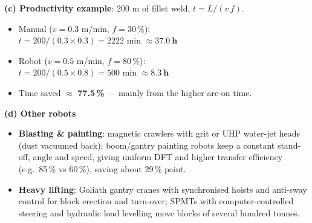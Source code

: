 \documentclass[11pt,a4paper]{article}
\begin{document}
\begin{enumerate}
\begin{answer}
\begin{minipage}[t]{0.57\linewidth}
				\medskip
				\textbf{(c) Productivity example}: 200 m of fillet weld, $t = L/(v\,f)$.
				\begin{itemize}[itemsep=1pt]
					\item Manual ($v = 0.3$ m/min, $f = 30\,\%$):\\
					$t = 200/(0.3\times0.3) = 2222$ min $\approx \mathbf{37.0\ h}$
					\item Robot ($v = 0.5$ m/min, $f = 80\,\%$):\\
					$t = 200/(0.5\times0.8) = 500$ min $\approx \mathbf{8.3\ h}$
					\item Time saved $\approx$ \textbf{77.5\,\%} --- mainly from the higher arc-on time.
				\end{itemize}
			\end{minipage}

			\medskip
			\textbf{(d) Other robots}
			\begin{itemize}[itemsep=1pt]
				\item \textbf{Blasting \& painting}: magnetic crawlers with grit or UHP water-jet heads (dust vacuumed back); boom/gantry painting robots keep a constant stand-off, angle and speed, giving uniform DFT and higher transfer efficiency (e.g.\ 85\,\% vs 60\,\%), saving about 29\,\% paint.
				\item \textbf{Heavy lifting}: Goliath gantry cranes with synchronised hoists and anti-sway control for block erection and turn-over; SPMTs with computer-controlled steering and hydraulic load levelling move blocks of several hundred tonnes.
			\end{itemize}
		\end{answer}

	\end{enumerate}
\end{document}
